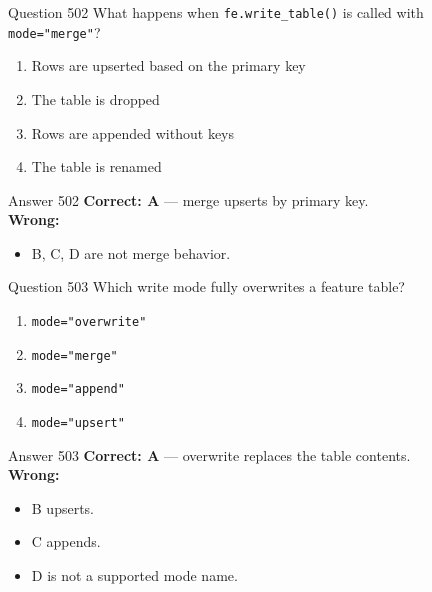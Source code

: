 \documentclass[aspectratio=169,11pt]{beamer}
\begin{document}
	\begin{frame}{Question 502}
		What happens when \texttt{fe.write\_table()} is called with \texttt{mode="merge"}?
		\begin{enumerate}[label=\Alph*.]
			\item Rows are upserted based on the primary key
			\item The table is dropped
			\item Rows are appended without keys
			\item The table is renamed
		\end{enumerate}
	\end{frame}
	\begin{frame}{Answer 502}
		\textbf{Correct: A} --- merge upserts by primary key.\\
		\vspace{0.5em}
		\textbf{Wrong:}
		\begin{itemize}
			\item B, C, D are not merge behavior.
		\end{itemize}
	\end{frame}
	
	\begin{frame}{Question 503}
		Which write mode fully overwrites a feature table?
		\begin{enumerate}[label=\Alph*.]
			\item \texttt{mode="overwrite"}
			\item \texttt{mode="merge"}
			\item \texttt{mode="append"}
			\item \texttt{mode="upsert"}
		\end{enumerate}
	\end{frame}
	\begin{frame}{Answer 503}
		\textbf{Correct: A} --- overwrite replaces the table contents.\\
		\vspace{0.5em}
		\textbf{Wrong:}
		\begin{itemize}
			\item B upserts.
			\item C appends.
			\item D is not a supported mode name.
		\end{itemize}
	\end{frame}
	
\end{document}
